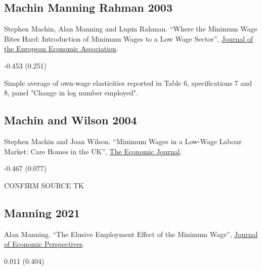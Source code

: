 \subsection*{Machin Manning Rahman 2003}
\vspace{-0.7em}

\noindent Stephen Machin, Alan Manning and Lupin Rahman. ``Where the Minimum Wage Bites Hard: Introduction of Minimum Wages to a Low Wage Sector'', \href{https://doi.org/10.1162/154247603322256792}{Journal of the European Economic Association}.

\vspace{0.7em}

 -0.453 (0.251)

\vspace{0.7em}

 Simple average of own-wage elasticities reported in Table 6, specifications 7 and 8, panel "Change in log number employed".

\subsection*{Machin and Wilson 2004}
\vspace{-0.7em}

\noindent Stephen Machin and Joan Wilson. ``Minimum Wages in a Low-Wage Labour Market: Care Homes in the UK'', \href{https://doi.org/10.1111/j.0013-0133.2003.00199.x}{The Economic Journal}.

\vspace{0.7em}

 -0.467 (0.077)

\vspace{0.7em}

 CONFIRM SOURCE TK

\subsection*{Manning 2021}
\vspace{-0.7em}

\noindent Alan Manning. ``The Elusive Employment Effect of the Minimum Wage'', \href{https://doi.org/10.1257/jep.35.1.3}{Journal of Economic Perspectives}.

\vspace{0.7em}

 0.011 (0.404)

